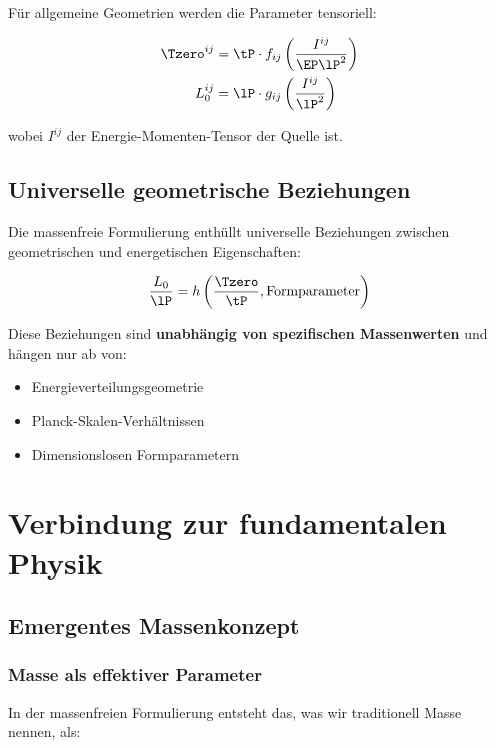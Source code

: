 	Für allgemeine Geometrien werden die Parameter tensoriell:
	
	\begin{align}
		\Tzero^{ij} &= \tP \cdot f_{ij}\left(\frac{I^{ij}}{\EP \lP^2}\right) \\
		L_0^{ij} &= \lP \cdot g_{ij}\left(\frac{I^{ij}}{\lP^2}\right)
	\end{align}
	
	wobei $I^{ij}$ der Energie-Momenten-Tensor der Quelle ist.
	
	\subsection{Universelle geometrische Beziehungen}
	\label{subsec:geometric_relations}
	
	Die massenfreie Formulierung enthüllt universelle Beziehungen zwischen geometrischen und energetischen Eigenschaften:
	
	\begin{equation}
		\frac{L_0}{\lP} = h\left(\frac{\Tzero}{\tP}, \text{Formparameter}\right)
		\label{eq:geometric_relation}
	\end{equation}
	
	Diese Beziehungen sind \textbf{unabhängig von spezifischen Massenwerten} und hängen nur ab von:
	\begin{itemize}
		\item Energieverteilungsgeometrie
		\item Planck-Skalen-Verhältnissen
		\item Dimensionslosen Formparametern
	\end{itemize}
	
	\section{Verbindung zur fundamentalen Physik}
	\label{sec:fundamental_connection}
	
	\subsection{Emergentes Massenkonzept}
	\label{subsec:emergent_mass}
	
	\subsubsection{Masse als effektiver Parameter}
	
	In der massenfreien Formulierung entsteht das, was wir traditionell Masse nennen, als:
	
